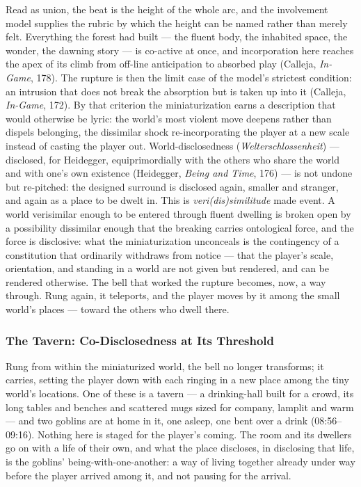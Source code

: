 Read as union, the beat is the height of the whole arc, and the involvement model supplies the rubric by which the height can be named rather than merely felt. Everything the forest had built — the fluent body, the inhabited space, the wonder, the dawning story — is co-active at once, and incorporation here reaches the apex of its climb from off-line anticipation to absorbed play (Calleja, \textit{In-Game}, 178). The rupture is then the limit case of the model's strictest condition: an intrusion that does not break the absorption but is taken up into it (Calleja, \textit{In-Game}, 172). By that criterion the miniaturization earns a description that would otherwise be lyric: the world's most violent move deepens rather than dispels belonging, the dissimilar shock re-incorporating the player at a new scale instead of casting the player out. World-disclosedness (\textit{Welterschlossenheit}) — disclosed, for Heidegger, equiprimordially with the others who share the world and with one's own existence (Heidegger, \textit{Being and Time}, 176) — is not undone but re-pitched: the designed surround is disclosed again, smaller and stranger, and again as a place to be dwelt in. This is \textit{veri(dis)similitude} made event. A world verisimilar enough to be entered through fluent dwelling is broken open by a possibility dissimilar enough that the breaking carries ontological force, and the force is disclosive: what the miniaturization unconceals is the contingency of a constitution that ordinarily withdraws from notice — that the player's scale, orientation, and standing in a world are not given but rendered, and can be rendered otherwise. The bell that worked the rupture becomes, now, a way through. Rung again, it teleports, and the player moves by it among the small world's places — toward the others who dwell there.

\subsubsection*{The Tavern: Co-Disclosedness at Its Threshold}

Rung from within the miniaturized world, the bell no longer transforms; it carries, setting the player down with each ringing in a new place among the tiny world's locations. One of these is a tavern — a drinking-hall built for a crowd, its long tables and benches and scattered mugs sized for company, lamplit and warm — and two goblins are at home in it, one asleep, one bent over a drink (08:56--09:16). Nothing here is staged for the player's coming. The room and its dwellers go on with a life of their own, and what the place discloses, in disclosing that life, is the goblins' being-with-one-another: a way of living together already under way before the player arrived among it, and not pausing for the arrival.

